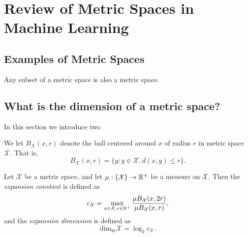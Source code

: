 \documentclass[../main.tex]{subfiles}
\newcommand{\set}[1]{\mathcal {#1}}
\newcommand{\radius}{r}
\newcommand{\dist}[2]{\distf({#1},{#2})}
\newcommand{\distf}{d}
\newcommand{\krdim}{\text{dim}_\text{kr}}
\begin{document}

\section{Review of Metric Spaces in Machine Learning}


\subsection{Examples of Metric Spaces}

\begin{example}
    Any subset of a metric space is also a metric space.
\end{example}


\subsection{What is the dimension of a metric space?}

In this section we introduce two 

\begin{definition}
    We let $B_\set X(x,\radius)$ denote the ball centered around $x$ of radius $r$ in metric space $\set X$.
    That is,
\begin{equation}
B_\set X(x,\radius) = \{ y : y\in\set X, \dist{x}{y} \le \radius \}.
\end{equation}
\end{definition}

\begin{definition}
    Let $\set X$ be a metric space, and let $\mu : \{\set X\} \to \R^+$ be a measure on $\set X$.
    Then the \emph{expansion constant} is defined as
    \begin{equation}
        c_\set X = \max_{x\in\set X, \radius\in\R^+} \frac{\mu B_{\set X}(x,2\radius)}{\mu B_{\set X}(x,\radius)}
        ,
    \end{equation}
    and the \emph{expansion dimension} is defined as
    \begin{equation}
        \krdim\set X = \log_2 c_\set X
        .
    \end{equation}
\end{definition}
\end{document}
